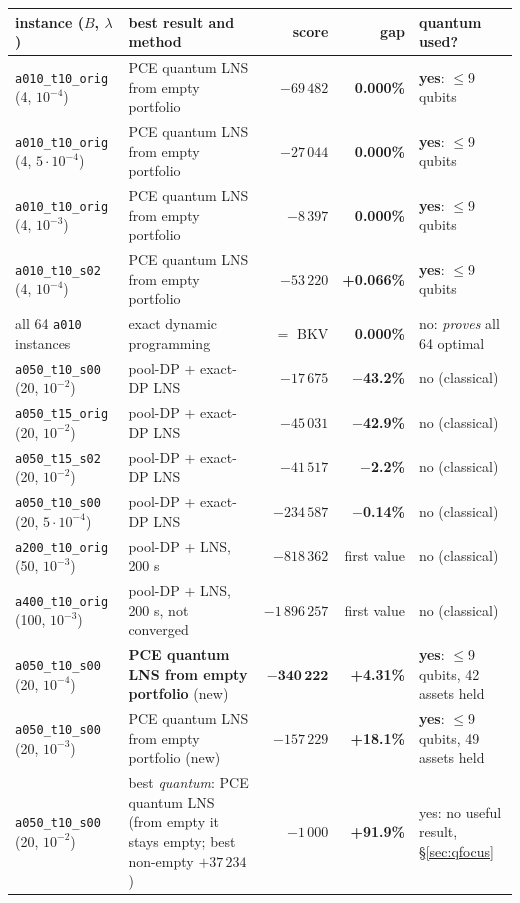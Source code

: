 \documentclass[11pt]{article}
\newcommand{\gapgood}[1]{\textcolor{good}{\textbf{#1}}}
\newcommand{\gapmid}[1]{\textcolor{mid}{\textbf{#1}}}
\newcommand{\gapbad}[1]{\textcolor{bad}{\textbf{#1}}}
\begin{document}
\begin{center}
\renewcommand{\arraystretch}{1.25}\small
\begin{tabularx}{\textwidth}{@{}>{\raggedright\arraybackslash}p{44mm}Lrr>{\raggedright\arraybackslash}p{27mm}@{}}
\toprule
instance ($B$, $\lambda$) & best result and method & score & gap & quantum used?\\
\midrule
\texttt{a010\_t10\_orig} (4, $10^{-4}$) & PCE quantum LNS from empty portfolio & $-69\,482$ & \gapgood{0.000\%} & \textbf{yes}: $\le$9 qubits\\
\texttt{a010\_t10\_orig} (4, $5\cdot10^{-4}$) & PCE quantum LNS from empty portfolio & $-27\,044$ & \gapgood{0.000\%} & \textbf{yes}: $\le$9 qubits\\
\texttt{a010\_t10\_orig} (4, $10^{-3}$) & PCE quantum LNS from empty portfolio & $-8\,397$ & \gapgood{0.000\%} & \textbf{yes}: $\le$9 qubits\\
\texttt{a010\_t10\_s02} (4, $10^{-4}$) & PCE quantum LNS from empty portfolio & $-53\,220$ & \gapmid{+0.066\%} & \textbf{yes}: $\le$9 qubits\\
all 64 \texttt{a010} instances & exact dynamic programming & $=$ BKV & \gapgood{0.000\%} & no: \emph{proves} all 64 optimal\\
\texttt{a050\_t10\_s00} (20, $10^{-2}$) & pool-DP + exact-DP LNS & $-17\,675$ & \gapgood{$-$43.2\%} & no (classical)\\
\texttt{a050\_t15\_orig} (20, $10^{-2}$) & pool-DP + exact-DP LNS & $-45\,031$ & \gapgood{$-$42.9\%} & no (classical)\\
\texttt{a050\_t15\_s02} (20, $10^{-2}$) & pool-DP + exact-DP LNS & $-41\,517$ & \gapgood{$-$2.2\%} & no (classical)\\
\texttt{a050\_t10\_s00} (20, $5\cdot10^{-4}$) & pool-DP + exact-DP LNS & $-234\,587$ & \gapgood{$-$0.14\%} & no (classical)\\
\texttt{a200\_t10\_orig} (50, $10^{-3}$) & pool-DP + LNS, 200 s & $-818\,362$ & first value & no (classical)\\
\texttt{a400\_t10\_orig} (100, $10^{-3}$) & pool-DP + LNS, 200 s, not converged & $-1\,896\,257$ & first value & no (classical)\\
\texttt{a050\_t10\_s00} (20, $10^{-4}$) & \textbf{PCE quantum LNS from empty portfolio} (new) & $\mathbf{-340\,222}$ & \gapgood{+4.31\%} & \textbf{yes}: $\le$9 qubits, 42 assets held\\
\texttt{a050\_t10\_s00} (20, $10^{-3}$) & PCE quantum LNS from empty portfolio (new) & $-157\,229$ & \gapmid{+18.1\%} & \textbf{yes}: $\le$9 qubits, 49 assets held\\
\texttt{a050\_t10\_s00} (20, $10^{-2}$) & best \emph{quantum}: PCE quantum LNS (from empty it stays empty; best non-empty $+37\,234$) & $-1\,000$ & \gapbad{+91.9\%} & yes: no useful result, \S\ref{sec:qfocus}\\
\bottomrule
\end{tabularx}
\end{center}
\end{document}
